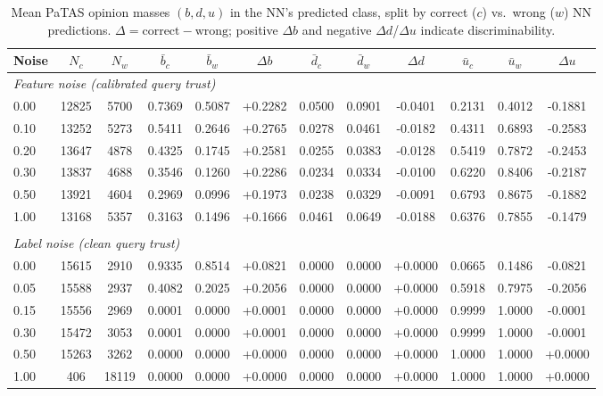 \begin{table}[ht]
\centering
\caption{Mean PaTAS opinion masses $(b, d, u)$ in the NN's predicted class, split by correct ($c$) vs.\ wrong ($w$) NN predictions. $\Delta = \text{correct} - \text{wrong}$; positive $\Delta b$ and negative $\Delta d$/$\Delta u$ indicate discriminability.}
\label{tab:patas-effectiveness}
\begin{tabular}{lccccccccccc}
\toprule
Noise & $N_c$ & $N_w$ & $\bar{b}_c$ & $\bar{b}_w$ & $\Delta b$ & $\bar{d}_c$ & $\bar{d}_w$ & $\Delta d$ & $\bar{u}_c$ & $\bar{u}_w$ & $\Delta u$ \\
\midrule
\multicolumn{12}{l}{\textit{Feature noise (calibrated query trust)}} \\
0.00 & 12825 & 5700 & 0.7369 & 0.5087 & +0.2282 & 0.0500 & 0.0901 & -0.0401 & 0.2131 & 0.4012 & -0.1881 \\
0.10 & 13252 & 5273 & 0.5411 & 0.2646 & +0.2765 & 0.0278 & 0.0461 & -0.0182 & 0.4311 & 0.6893 & -0.2583 \\
0.20 & 13647 & 4878 & 0.4325 & 0.1745 & +0.2581 & 0.0255 & 0.0383 & -0.0128 & 0.5419 & 0.7872 & -0.2453 \\
0.30 & 13837 & 4688 & 0.3546 & 0.1260 & +0.2286 & 0.0234 & 0.0334 & -0.0100 & 0.6220 & 0.8406 & -0.2187 \\
0.50 & 13921 & 4604 & 0.2969 & 0.0996 & +0.1973 & 0.0238 & 0.0329 & -0.0091 & 0.6793 & 0.8675 & -0.1882 \\
1.00 & 13168 & 5357 & 0.3163 & 0.1496 & +0.1666 & 0.0461 & 0.0649 & -0.0188 & 0.6376 & 0.7855 & -0.1479 \\
\midrule \\
\multicolumn{12}{l}{\textit{Label noise (clean query trust)}} \\
0.00 & 15615 & 2910 & 0.9335 & 0.8514 & +0.0821 & 0.0000 & 0.0000 & +0.0000 & 0.0665 & 0.1486 & -0.0821 \\
0.05 & 15588 & 2937 & 0.4082 & 0.2025 & +0.2056 & 0.0000 & 0.0000 & +0.0000 & 0.5918 & 0.7975 & -0.2056 \\
0.15 & 15556 & 2969 & 0.0001 & 0.0000 & +0.0001 & 0.0000 & 0.0000 & +0.0000 & 0.9999 & 1.0000 & -0.0001 \\
0.30 & 15472 & 3053 & 0.0001 & 0.0000 & +0.0001 & 0.0000 & 0.0000 & +0.0000 & 0.9999 & 1.0000 & -0.0001 \\
0.50 & 15263 & 3262 & 0.0000 & 0.0000 & +0.0000 & 0.0000 & 0.0000 & +0.0000 & 1.0000 & 1.0000 & +0.0000 \\
1.00 & 406 & 18119 & 0.0000 & 0.0000 & +0.0000 & 0.0000 & 0.0000 & +0.0000 & 1.0000 & 1.0000 & +0.0000 \\

\end{tabular}
\end{table}
